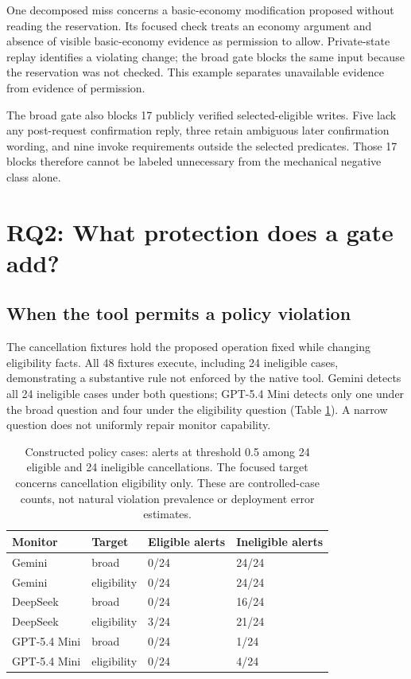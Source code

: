 One decomposed miss concerns a basic-economy modification proposed
without reading the reservation. Its focused check treats an economy
argument and absence of visible basic-economy evidence as permission to
allow. Private-state replay identifies a violating change; the broad
gate blocks the same input because the reservation was not checked. This
example separates unavailable evidence from evidence of permission.

The broad gate also blocks 17 publicly verified selected-eligible
writes. Five lack any post-request confirmation reply, three retain
ambiguous later confirmation wording, and nine invoke requirements
outside the selected predicates. Those 17 blocks therefore cannot be
labeled unnecessary from the mechanical negative class alone.

\section{RQ2: What protection does a gate
add?}\label{rq2-what-protection-does-a-gate-add}

\subsection{When the tool permits a policy
violation}\label{when-the-tool-permits-a-policy-violation}

The cancellation fixtures hold the proposed operation fixed while
changing eligibility facts. All 48 fixtures execute, including 24
ineligible cases, demonstrating a substantive rule not enforced by the
native tool. Gemini detects all 24 ineligible cases under both
questions; GPT-5.4 Mini detects only one under the broad question and
four under the eligibility question (Table \ref{tab:policy-lab}). A
narrow question does not uniformly repair monitor capability.

\begin{table}[!htbp]\centering\small
\caption{Constructed policy cases: alerts at threshold 0.5 among 24 eligible and 24 ineligible cancellations. The focused target concerns cancellation eligibility only.  These are controlled-case counts, not natural violation prevalence or deployment error estimates.}\label{tab:policy-lab}
\begin{tabular}{llll}
\toprule
Monitor & Target & Eligible alerts & Ineligible alerts\\
\midrule
Gemini & broad & 0/24 & 24/24\\
Gemini & eligibility & 0/24 & 24/24\\
DeepSeek & broad & 0/24 & 16/24\\
DeepSeek & eligibility & 3/24 & 21/24\\
GPT-5.4 Mini & broad & 0/24 & 1/24\\
GPT-5.4 Mini & eligibility & 0/24 & 4/24\\
\bottomrule
\end{tabular}
\end{table}

